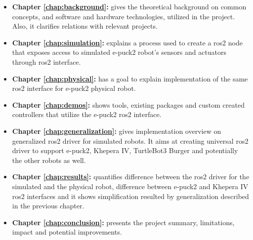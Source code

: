\begin{itemize}
    \item \textbf{Chapter \ref{chap:background}: } gives the theoretical background on common concepts, and software and hardware technologies, utilized in the project.
    Also, it clarifies relations with relevant projects.
    
    \item \textbf{Chapter \ref{chap:simulation}: } explains a process used to create a \ac{ros2} node that exposes access to simulated e-puck2 robot's sensors and actuators through \ac{ros2} interface.
    
    \item \textbf{Chapter \ref{chap:physical}: } has a goal to explain implementation of the same \ac{ros2} interface for e-puck2 physical robot.
    
    \item \textbf{Chapter \ref{chap:demos}: } shows tools, existing packages and custom created controllers that utilize the e-puck2 \ac{ros2} interface.
    
    \item \textbf{Chapter \ref{chap:generalization}: } gives implementation overview on generalized \ac{ros2} driver for simulated robots.
    It aims at creating universal \ac{ros2} driver to support e-puck2, Khepera IV, TurtleBot3 Burger and potentially the other robots as well.
    
    \item \textbf{Chapter \ref{chap:results}: } quantifies difference between the \ac{ros2} driver for the simulated and the physical robot, difference between e-puck2 and Khepera IV \ac{ros2} interfaces and it shows simplification resulted by generalization described in the previous chapter.
    
    \item \textbf{Chapter \ref{chap:conclusion}: } presents the project summary, limitations, impact and potential improvements.
\end{itemize}